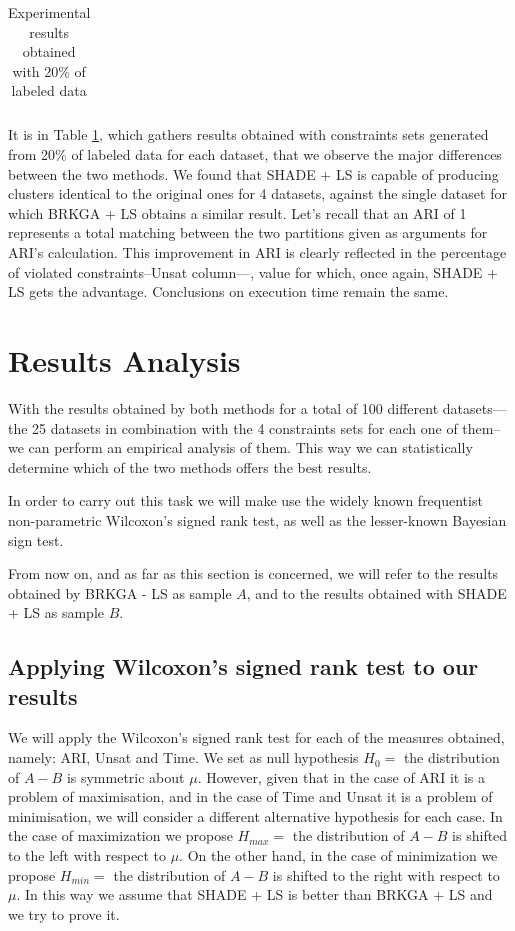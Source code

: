 \documentclass[review]{elsarticle}
\begin{document}
\begin{table}[!h]
{\begin{tabular}{l ccc c ccc}
		\end{tabular}}
		
	\caption{Experimental results obtained with 20\% of labeled data}
	\label{tab:results20}
\end{table}

It is in Table \ref{tab:results20}, which gathers results obtained with constraints sets generated from 20\% of labeled data for each dataset, that we observe the major differences between the two methods. We found that SHADE + LS is capable of producing clusters identical to the original ones for 4 datasets, against the single dataset for which BRKGA + LS obtains a similar result. Let's recall that an ARI of 1 represents a total matching between the two partitions given as arguments for ARI's calculation. This improvement in ARI is clearly reflected in the percentage of violated constraints--Unsat column---, value for which, once again, SHADE + LS gets the advantage. Conclusions on execution time remain the same.

\section{Results Analysis}

With the results obtained by both methods for a total of 100 different datasets---the 25 datasets in combination with the 4 constraints sets for each one of them--we can perform an empirical analysis of them. This way we can statistically determine which of the two methods offers the best results.

In order to carry out this task we will make use the widely known frequentist non-parametric Wilcoxon's signed rank test, as well as the lesser-known Bayesian sign test.

From now on, and as far as this section is concerned, we will refer to the results obtained by BRKGA - LS as sample $A$, and to the results obtained with SHADE + LS as sample $B$.

\subsection{Applying Wilcoxon's signed rank test to our results}

We will apply the Wilcoxon's signed rank test for each of the measures obtained, namely: ARI, Unsat and Time. We set as null hypothesis $H_0 = $ the distribution of $A - B$ is symmetric about $\mu$. However, given that in the case of ARI it is a problem of maximisation, and in the case of Time and Unsat it is a problem of minimisation, we will consider a different alternative hypothesis for each case. In the case of maximization we propose $H_{max} =$ the distribution of $A - B$ is shifted to the left with respect to $\mu$. On the other hand, in the case of minimization we propose $H_{min} =$ the distribution of $A - B$ is shifted to the right with respect to $\mu$. In this way we assume that SHADE + LS is better than BRKGA + LS and we try to prove it.
\end{document}
